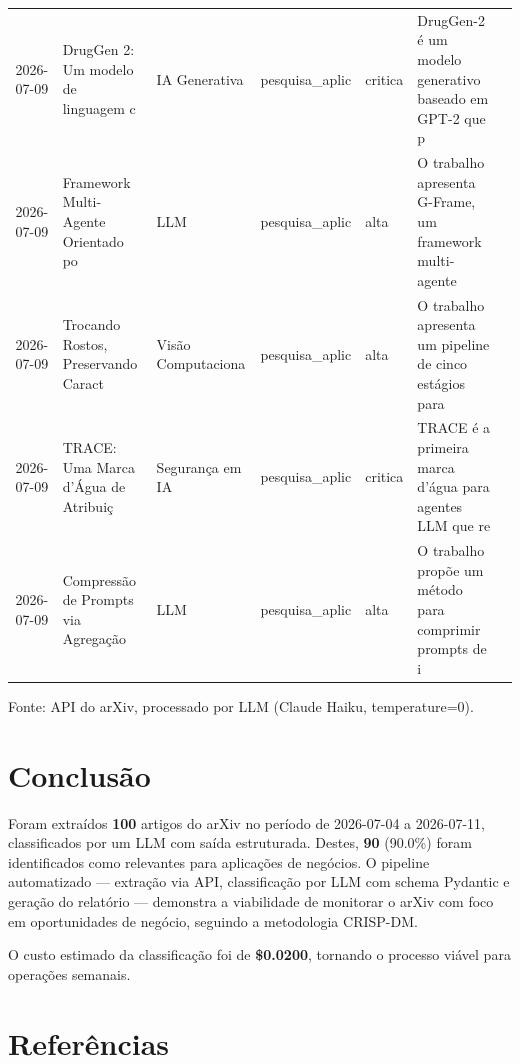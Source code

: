 \documentclass[
  brazilian,
  11pt,
  letterpaper,
  DIV=11,
  numbers=noendperiod]{scrartcl}
\begin{document}
\begin{table}
{\begin{threeparttable}
\begin{tabular}{cp{1.2cm}p{3.5cm}p{2cm}p{1.8cm}p{1.2cm}p{4cm}}
    2026-07-09 & DrugGen 2: Um modelo de linguagem c & IA Generativa & pesquisa\_aplic & critica & DrugGen-2 é um modelo generativo baseado em GPT-2 que p \\
    2026-07-09 & Framework Multi-Agente Orientado po & LLM & pesquisa\_aplic & alta & O trabalho apresenta G-Frame, um framework multi-agente \\
    2026-07-09 & Trocando Rostos, Preservando Caract & Visão Computaciona & pesquisa\_aplic & alta & O trabalho apresenta um pipeline de cinco estágios para \\
    2026-07-09 & TRACE: Uma Marca d'Água de Atribuiç & Segurança em IA & pesquisa\_aplic & critica & TRACE é a primeira marca d'água para agentes LLM que re \\
    2026-07-09 & Compressão de Prompts via Agregação & LLM & pesquisa\_aplic & alta & O trabalho propõe um método para comprimir prompts de i \\

\bottomrule
\end{tabular}
\begin{tablenotes}\scriptsize
\item Fonte: API do arXiv, processado por LLM (Claude Haiku, temperature=0).
\end{tablenotes}
\end{threeparttable}

}

\end{table}%

\section{Conclusão}\label{conclusuxe3o}

Foram extraídos \textbf{100} artigos do arXiv no período de 2026-07-04 a
2026-07-11, classificados por um LLM com saída estruturada. Destes,
\textbf{90} (90.0\%) foram identificados como relevantes para aplicações
de negócios. O pipeline automatizado --- extração via API, classificação
por LLM com schema Pydantic e geração do relatório --- demonstra a
viabilidade de monitorar o arXiv com foco em oportunidades de negócio,
seguindo a metodologia CRISP-DM.

O custo estimado da classificação foi de \textbf{\$0.0200}, tornando o
processo viável para operações semanais.

\section{Referências}\label{referuxeancias}

\protect{}\label{refs}
\end{document}
